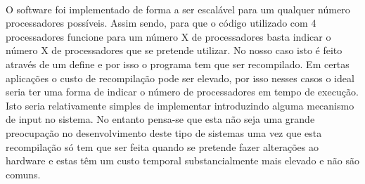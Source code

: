 \paragraph{}
O software foi implementado de forma a ser escalável para um qualquer número processadores possíveis. Assim sendo, para que o código utilizado com 4 processadores funcione para um número X de processadores basta indicar o número X de processadores que se pretende utilizar. No nosso caso isto é feito através de um define e por isso o programa tem que ser recompilado. Em certas aplicações o custo de recompilação pode ser elevado, por isso nesses casos o ideal seria ter uma forma de indicar o número de processadores em tempo de execução. Isto seria relativamente simples de implementar introduzindo alguma mecanismo de input no sistema. No entanto pensa-se que esta não seja uma grande preocupação no desenvolvimento deste tipo de sistemas uma vez que esta recompilação só tem que ser feita quando se pretende fazer alterações ao hardware e estas têm um custo temporal substancialmente mais elevado e não são comuns.


